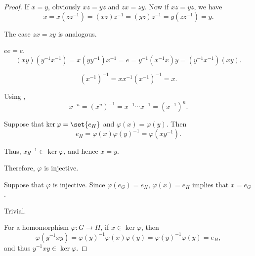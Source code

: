 \begin{proof}
   If \( x = y \), obviously \( xz = yz \) and \( zx = zy \). Now if \( xz = yz \), we have
  \begin{equation*}
    x = x(zz^{-1}) = (xz)z^{-1} = (yz)z^{-1} = y(zz^{-1}) = y.
  \end{equation*}

  The case \( zx = zy \) is analogous.

   \( ee = e \).
  \begin{equation*}
    (xy) (y^{-1} x^{-1})
    =
    x (y y^{-1}) x^{-1}
    =
    e
    =
    y^{-1} (x^{-1} x) y
    =
    (y^{-1} x^{-1}) (xy).
  \end{equation*}

  \begin{equation*}
    (x^{-1})^{-1}
    =
    x x^{-1} (x^{-1})^{-1}
    =
    x.
  \end{equation*}

   Using ,
  \begin{equation*}
    x^{-n}
    =
    (x^n)^{-1}
    =
    x^{-1} \cdots x^{-1}
    =
    (x^{-1})^n.
  \end{equation*}

  \SufficiencySubProof* Suppose that \( \ker \varphi = \set{ e_H } \) and \( \varphi(x) = \varphi(y) \). Then
  \begin{equation*}
    e_H = \varphi(x) \varphi(y)^{-1} = \varphi(x y^{-1}).
  \end{equation*}

  Thus, \( x y^{-1} \in \ker \varphi \), and hence \( x = y \).

  Therefore, \( \varphi \) is injective.

  \NecessitySubProof* Suppose that \( \varphi \) is injective. Since \( \varphi(e_G) = e_H \), \( \varphi(x) = e_H \) implies that \( x = e_G \).

   Trivial.

   For a homomorphism \( \varphi: G \to H \), if \( x \in \ker \varphi \), then
  \begin{equation*}
    \varphi(y^{-1} x y) = \varphi(y)^{-1} \varphi(x) \varphi(y) = \varphi(y)^{-1} \varphi(y) = e_H,
  \end{equation*}
  and thus \( y^{-1} x y \in \ker \varphi \).
\end{proof}

